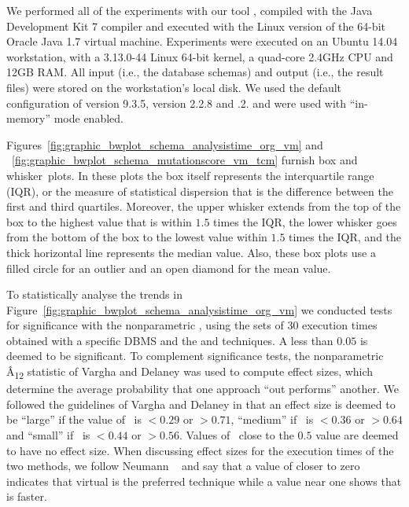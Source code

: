 
We performed all of the experiments with our \SA tool \cite{Kapfhammer2013,McMinn2015,Wright2014}, compiled with the Java Development Kit 7 compiler and executed with the Linux version of the 64-bit Oracle Java 1.7 virtual machine.  Experiments were executed on an Ubuntu 14.04 workstation, with a 3.13.0-44 Linux 64-bit kernel, a quad-core 2.4GHz CPU and 12GB RAM. All input (i.e., the database schemas) and output (i.e., the result files) were stored on the workstation's local disk. We used the default configuration of \PostgreSQL version 9.3.5, \HyperSQL version 2.2.8 and .2.  \HyperSQL and \SQLite were used with ``in-memory'' mode enabled.

% 


 Figures~\ref{fig:graphic_bwplot_schema_analysistime_org_vm} and ~\ref{fig:graphic_bwplot_schema_mutationscore_vm_tcm} furnish box and \mbox{whisker plots}.  In these plots the box itself represents the interquartile range (IQR), or the measure of statistical dispersion that is the difference between the first and third quartiles. Moreover, the upper whisker extends from the top of the box to the highest value that is within $1.5$ times the IQR, the lower whisker goes from the bottom of the box to the lowest value within $1.5$ times the IQR, and the thick horizontal line represents the median value. Also, these box plots use a filled circle for an outlier and an open diamond for the mean value.


To statistically analyse the trends in Figure~\ref{fig:graphic_bwplot_schema_analysistime_org_vm} we conducted tests for significance with the nonparametric \wilcoxon, using the sets of 30 execution times obtained with a specific DBMS and the \Original and \vma techniques.  A \pvalue less than $0.05$ is deemed to be significant.  To complement significance tests, the nonparametric \^{A}\textsubscript{12} statistic of Vargha and Delaney \cite{Vargha2000} was used to compute effect sizes, which determine the average probability that one approach ``out performs'' another.  We followed the guidelines of Vargha and Delaney in that an effect size is deemed to be ``large'' if the value of \atwelve~is $< 0.29$ or $> 0.71$, ``medium'' if \atwelve~is $< 0.36$ or $> 0.64$ and ``small'' if \atwelve~is $< 0.44$ or $> 0.56$.  Values of \atwelve~close to the $0.5$ value are deemed to have no effect size.  When discussing effect sizes for the execution times of the two methods, we follow Neumann \etal~\cite{Neumann2015} and say that a value of \atwelve closer to zero indicates that virtual is the preferred technique while a value near one shows that \Original is faster.

